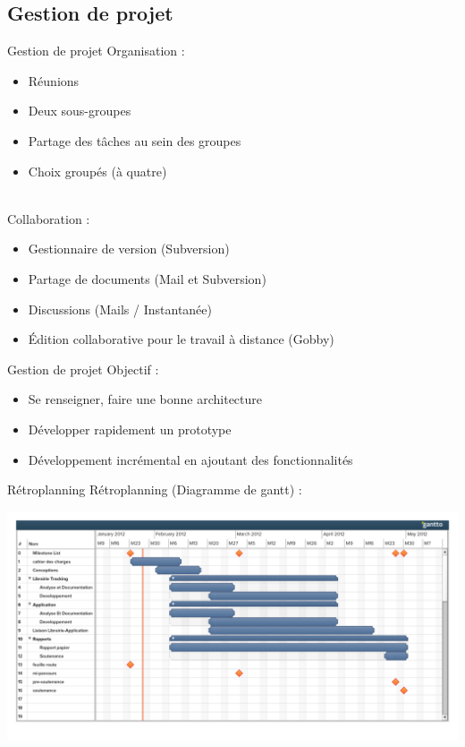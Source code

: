 \documentclass{beamer}
\begin{document}
	\subsection{Gestion de projet}
		\begin{frame}{Gestion de projet}
		Organisation :
			\begin{itemize}
				\item{Réunions}
				\item{Deux sous-groupes}
				\item{Partage des tâches au sein des groupes}
				\item{Choix groupés (à quatre)}
			\end{itemize}
		\ \\
		
		Collaboration :
			\begin{itemize}
				\item{Gestionnaire de version (Subversion)}
				\item{Partage de documents (Mail et Subversion)}
				\item{Discussions (Mails / Instantanée)}
				\item{Édition collaborative pour le travail à distance (Gobby)}
			\end{itemize}
		\end{frame}
		
		\begin{frame}{Gestion de projet}
			Objectif :
			\begin{itemize}
			\item Se renseigner, faire une bonne architecture
			\item Développer rapidement un prototype
			\item Développement incrémental en ajoutant des fonctionnalités
			\end{itemize} 
		\end{frame}
		
		\begin{frame}{Rétroplanning}	
			Rétroplanning (Diagramme de gantt) :
			\begin{center}
			\includegraphics[scale=0.25]{../feuille-route/retroplanning.pdf}
			\end{center}
		\end{frame}
	
\end{document}

